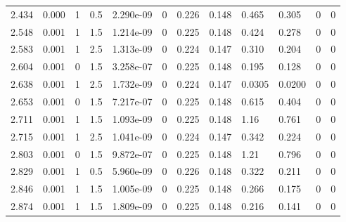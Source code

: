 \documentclass[preview]{standalone}
\begin{document}
{{\begin{tabular}{L{1.2cm}C{1.2cm} C{0.3cm}C{0.5cm} C{1.4cm}C{1.4cm} C{1.4cm}C{1.4cm} C{1.6cm}C{1.6cm} C{1.6cm}C{1.6cm}}
  2.434  &  0.000  & 1     & 0.5 &  2.290e-09  & 0  &  0.226&   0.148& 0.465 & 0.305   &  0 & 0  \\ 
  2.548  &  0.001  & 1     & 1.5 &  1.214e-09  & 0  &  0.225&   0.148& 0.424 & 0.278   &  0 & 0  \\ 
  2.583  &  0.001  & 1     & 2.5 &  1.313e-09  & 0  &  0.224&   0.147& 0.310 & 0.204   &  0 & 0  \\ 
  2.604  &  0.001  & 0     & 1.5 &  3.258e-07  & 0  &  0.225&   0.148& 0.195 & 0.128   &  0 & 0  \\ 
  2.638  &  0.001  & 1     & 2.5 &  1.732e-09  & 0  &  0.224&   0.147& 0.0305 & 0.0200   &  0 & 0  \\ 
  2.653  &  0.001  & 0     & 1.5 &  7.217e-07  & 0  &  0.225&   0.148& 0.615 & 0.404   &  0 & 0  \\ 
  2.711  &  0.001  & 1     & 1.5 &  1.093e-09  & 0  &  0.225&   0.148& 1.16 & 0.761   &  0 & 0  \\ 
  2.715  &  0.001  & 1     & 2.5 &  1.041e-09  & 0  &  0.224&   0.147& 0.342 & 0.224   &  0 & 0  \\ 
  2.803  &  0.001  & 0     & 1.5 &  9.872e-07  & 0  &  0.225&   0.148& 1.21 & 0.796   &  0 & 0  \\ 
  2.829  &  0.001  & 1     & 0.5 &  5.960e-09  & 0  &  0.226&   0.148& 0.322 & 0.211   &  0 & 0  \\ 
  2.846  &  0.001  & 1     & 1.5 &  1.005e-09  & 0  &  0.225&   0.148& 0.266 & 0.175   &  0 & 0  \\ 
  2.874  &  0.001  & 1     & 1.5 &  1.809e-09  & 0  &  0.225&   0.148& 0.216 & 0.141   &  0 & 0  \\ 
\hline 
\end{tabular} 

}}
\end{document}

